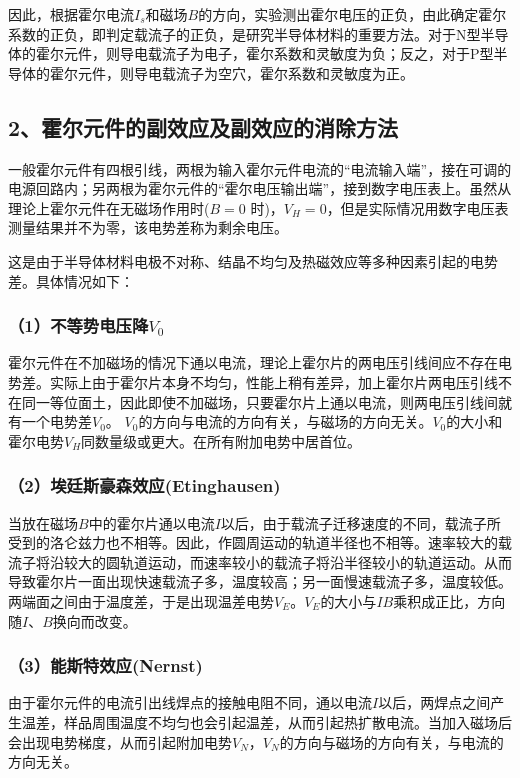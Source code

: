 \documentclass[UTF8]{article}
\begin{document}
	因此，根据霍尔电流$I_s$和磁场$B$的方向，实验测出霍尔电压的正负，由此确定霍尔系数的正负，即判定载流子的正负，是研究半导体材料的重要方法。对于N型半导体的霍尔元件，则导电载流子为电子，霍尔系数和灵敏度为负；反之，对于P型半导体的霍尔元件，则导电载流子为空穴，霍尔系数和灵敏度为正。
	
	\subsection*{2、霍尔元件的副效应及副效应的消除方法}
	一般霍尔元件有四根引线，两根为输入霍尔元件电流的“电流输入端”，接在可调的电源回路内；另两根为霍尔元件的“霍尔电压输出端”，接到数字电压表上。虽然从理论上霍尔元件在无磁场作用时($B=0$ 时)，$V_H=0$，但是实际情况用数字电压表测量结果并不为零，该电势差称为剩余电压。
	
	这是由于半导体材料电极不对称、结晶不均匀及热磁效应等多种因素引起的电势差。具体情况如下：
	
	\subsubsection*{（1）不等势电压降$V_0$}
	霍尔元件在不加磁场的情况下通以电流，理论上霍尔片的两电压引线间应不存在电势差。实际上由于霍尔片本身不均匀，性能上稍有差异，加上霍尔片两电压引线不在同一等位面土，因此即使不加磁场，只要霍尔片上通以电流，则两电压引线间就有一个电势差$V_0$。
	$V_0$的方向与电流的方向有关，与磁场的方向无关。$V_0$的大小和霍尔电势$V_H$同数量级或更大。在所有附加电势中居首位。
	
	\subsubsection*{（2）埃廷斯豪森效应(Etinghausen)}
	当放在磁场$B$中的霍尔片通以电流$I$以后，由于载流子迁移速度的不同，载流子所受到的洛仑兹力也不相等。因此，作圆周运动的轨道半径也不相等。速率较大的载流子将沿较大的圆轨道运动，而速率较小的载流子将沿半径较小的轨道运动。从而导致霍尔片一面出现快速载流子多，温度较高；另一面慢速载流子多，温度较低。两端面之间由于温度差，于是出现温差电势$V_E$。$V_E$的大小与$IB$乘积成正比，方向随$I$、$B$换向而改变。
	
	\subsubsection*{（3）能斯特效应(Nernst)}
	由于霍尔元件的电流引出线焊点的接触电阻不同，通以电流$I$以后，两焊点之间产生温差，样品周围温度不均匀也会引起温差，从而引起热扩散电流。当加入磁场后会出现电势梯度，从而引起附加电势$V_N$，$V_N$的方向与磁场的方向有关，与电流的方向无关。
	
\end{document}
